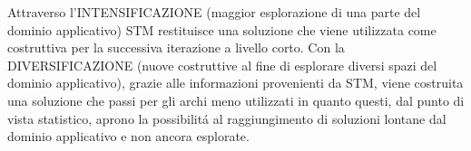 	
	
	Attraverso l'INTENSIFICAZIONE (maggior esplorazione di una parte del dominio applicativo) STM restituisce una soluzione che viene utilizzata come costruttiva per la successiva iterazione a livello corto.
Con la DIVERSIFICAZIONE (nuove costruttive al fine di esplorare diversi spazi del dominio applicativo), grazie alle informazioni provenienti da STM, viene costruita una soluzione che passi per gli archi meno utilizzati in quanto questi, dal punto di vista statistico, aprono la possibilit\'{a} al raggiungimento di soluzioni lontane dal dominio applicativo e non ancora esplorate.